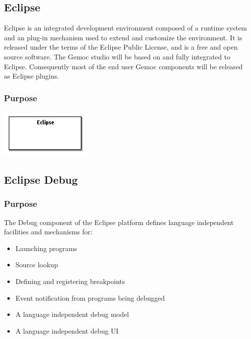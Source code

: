 \documentclass{gemoc} %
\begin{document}
\subsection{Eclipse}
Eclipse is an integrated development environment composed of a runtime system and an plug-in mechanism used to extend and customize the environment. It is released under the terms of the Eclipse Public License, and is a free and open source software. The Gemoc studio will be based on and fully integrated to Eclipse. Consequently most of the end user Gemoc components will be released as Eclipse plugins.

\subsubsection{Purpose}


\begin{center}
\includegraphics*[trim=0.0cm 0.0cm 0cm 0.0cm, clip=true]{../images/generated/Generated_Eclipse.png}
\end{center}




\subsection{Eclipse Debug}


\subsubsection{Purpose}
The Debug component of the Eclipse platform defines language independent facilities and mechanisms for:
\begin{itemize}
\item Launching programs
\item Source lookup
\item Defining and registering breakpoints
\item Event notification from programs being debugged
\item A language independent debug model
\item A language independent debug UI
\end{itemize}
\end{document}
